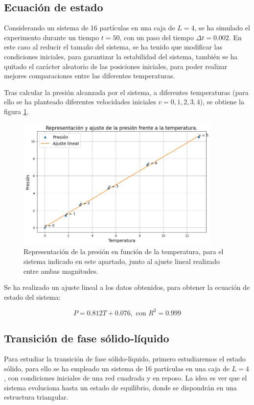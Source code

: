 \documentclass[11pt, twoside]{article} %
\begin{document}
\newpage

\subsection{Ecuación de estado}
Considerando un sistema de 16 partículas en una caja de $L=4$, se ha simulado el
experimento durante un tiempo $t=50$, con un paso del tiempo $\Delta t = 0.002$.
En este caso al reducir el tamaño del sistema, se ha tenido que modificar las condiciones
iniciales, para garantizar la estabilidad del sistema, también se ha quitado el carácter
aleatorio de las posiciones iniciales, para poder realizar mejores comparaciones entre 
las diferentes temperaturas.

Tras calcular la presión alcanzada por el sistema, a diferentes temperaturas (para ello
se ha planteado diferentes velocidades iniciales $v = 0, 1, 2, 3, 4$), se obtiene la 
figura \ref{fig:ecuacion_estado}.

\begin{figure}[h!]
    \centering
    \includegraphics[width=0.9\textwidth]{plots/ajuste_presion.png}
    \caption{Representación de la presión en función de la temperatura, para el sistema
    indicado en este apartado, junto al ajuste lineal realizado entre ambas magnitudes.}
    \label{fig:ecuacion_estado}
\end{figure}

Se ha realizado un ajuste lineal a los datos obtenidos, para obtener la ecuación de
estado del sistema:

\begin{equation}
    P = 0.812 T + 0.076, \text{ con } R^2 = 0.999
\end{equation}


\subsection{Transición de fase sólido-líquido}
Para estudiar la transición de fase sólido-líquido, primero estudiaremos el estado
sólido, para ello se ha empleado un sistema de 16 partículas en una caja de 
$L=4$, con condiciones iniciales de una red cuadrada y en reposo. La idea es ver 
que el sistema evoluciona hasta un estado de equilibrio, donde se dispondrán 
en una estructura triangular.
\end{document}
